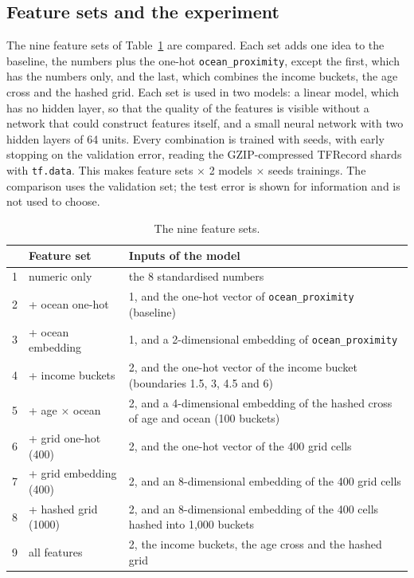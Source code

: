 \subsection{Feature sets and the experiment}

The nine feature sets of Table~\ref{tab:featuresets} are compared. Each set adds one idea to the baseline, the numbers plus the one-hot \texttt{ocean\_proximity}, except the first, which has the numbers only, and the last, which combines the income buckets, the age cross and the hashed grid. Each set is used in two models: a linear model, which has no hidden layer, so that the quality of the features is visible without a network that could construct features itself, and a small neural network with two hidden layers of 64 units. Every combination is trained with  seeds, with early stopping on the validation error, reading the GZIP-compressed TFRecord shards with \texttt{tf.data}. This makes  feature sets $\times$ 2 models $\times$  seeds trainings. The comparison uses the validation set; the test error is shown for information and is not used to choose.

\begin{table}[!htbp]
\centering
\small
\begin{tabular}{llp{8.6cm}}
\toprule
 & Feature set & Inputs of the model \\
\midrule
1 & numeric only & the 8 standardised numbers \\
2 & + ocean one-hot & 1, and the one-hot vector of \texttt{ocean\_proximity} (baseline) \\
3 & + ocean embedding & 1, and a 2-dimensional embedding of \texttt{ocean\_proximity} \\
4 & + income buckets & 2, and the one-hot vector of the income bucket (boundaries 1.5, 3, 4.5 and 6) \\
5 & + age $\times$ ocean & 2, and a 4-dimensional embedding of the hashed cross of age and ocean (100 buckets) \\
6 & + grid one-hot (400) & 2, and the one-hot vector of the 400 grid cells \\
7 & + grid embedding (400) & 2, and an 8-dimensional embedding of the 400 grid cells \\
8 & + hashed grid (1000) & 2, and an 8-dimensional embedding of the 400 cells hashed into 1,000 buckets \\
9 & all features & 2, the income buckets, the age cross and the hashed grid \\
\bottomrule
\end{tabular}
\caption{The nine feature sets.}
\label{tab:featuresets}
\end{table}


